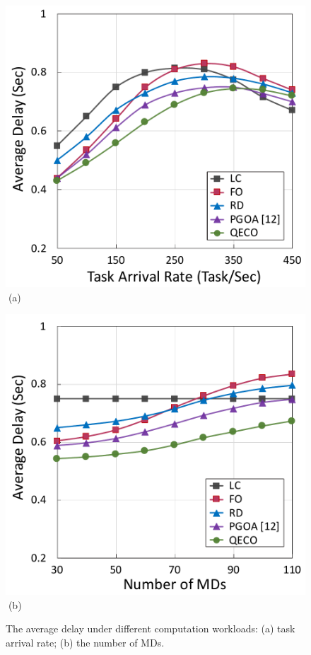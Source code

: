 \documentclass[12pt,draftclsnofoot,onecolumn]{IEEEtran}
\begin{document}
\begin{figure}[t]
	\centering
	\captionsetup{name=Fig.}
	\begin{minipage}[b]{0.340\linewidth}
		\centering
		\includegraphics[width=\textwidth]{Fig/delay_1} 		
		\textcolor{white}{i}\hspace{0.6cm}(a)
	\end{minipage}
	\hspace{-0.2cm}
	\begin{minipage}[b]{0.340\linewidth}
		\centering
		\includegraphics[width=\textwidth]{Fig/delay_2}
		\textcolor{white}{i}\hspace{0.6cm}(b)
	\end{minipage}
	\caption{The average delay under different computation workloads: (a) task arrival rate; (b) the number of MDs.}
	\label{chart3}
\end{figure} 
\end{document}
